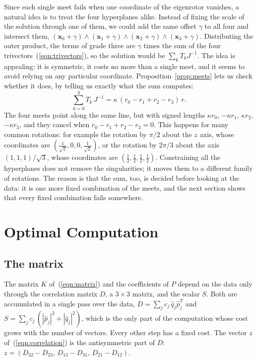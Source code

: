 \documentclass{birkjour}
\theoremstyle{definition}
\theoremstyle{remark}
\numberwithin{equation}{section}
\begin{document}
Since each single meet fails when one coordinate of the eigenrotor vanishes, a natural idea is to treat the four hyperplanes alike. Instead of fixing the scale of the solution through one of them, we could add the same offset $\gamma$ to all four and intersect them, $(\mathbf x_0 + \gamma) \wedge (\mathbf x_1 + \gamma) \wedge (\mathbf x_2 + \gamma) \wedge (\mathbf x_3 + \gamma)$. Distributing the outer product, the terms of grade three are $\gamma$ times the sum of the four trivectors~(\ref{eqn:trivectors}), so the solution would be $\sum_k T_k J^{-1}$. The idea is appealing: it is symmetric, it costs no more than a single meet, and it seems to avoid relying on any particular coordinate. Proposition~\ref{prop:meets} lets us check whether it does, by telling us exactly what the sum computes:
\begin{equation}
\label{eqn:sum_of_meets}
\sum_{k=0}^3 T_k\, J^{-1} = \kappa\, (r_0 - r_1 + r_2 - r_3)\, r.
\end{equation}
The four meets point along the same line, but with signed lengths $\kappa r_0$, $-\kappa r_1$, $\kappa r_2$, $-\kappa r_3$, and they cancel when $r_0 - r_1 + r_2 - r_3 = 0$. This happens for many common rotations: for example the rotation by $\pi/2$ about the $z$ axis, whose coordinates are $(\frac{1}{\sqrt2}, 0, 0, \frac{1}{\sqrt2})$, or the rotation by $2\pi/3$ about the axis $(1, 1, 1)/\sqrt3$, whose coordinates are $(\frac12, \frac12, \frac12, \frac12)$. Constraining all the hyperplanes does not remove the singularities; it moves them to a different family of rotations. The reason is that the sum, too, is decided before looking at the data: it is one more fixed combination of the meets, and the next section shows that every fixed combination fails somewhere.

\section{Optimal Computation}
\label{section:computation}

\subsection{The matrix}

The matrix $K$ of~(\ref{eqn:matrix}) and the coefficients of $P$ depend on the data only through the correlation matrix $D$, a $3 \times 3$ matrix, and the scalar $S$. Both are accumulated in a single pass over the data, $D = \sum_j c_j\, \hat q_j \hat p_j^T$ and $S = \sum_j c_j\, (|\hat p_j|^2 + |\hat q_j|^2)$, which is the only part of the computation whose cost grows with the number of vectors. Every other step has a fixed cost. The vector $z$ of~(\ref{eqn:correlation}) is the antisymmetric part of $D$: $z = (D_{32} - D_{23},\, D_{13} - D_{31},\, D_{21} - D_{12})$.
\end{document}
